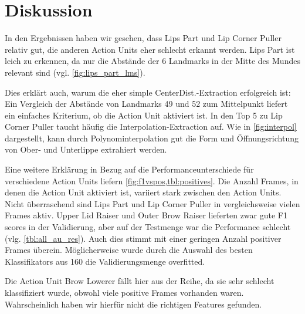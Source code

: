 \chapter{Diskussion}\label{ch:diskussion}

In den Ergebnissen haben wir gesehen, dass Lips Part und Lip Corner Puller
relativ gut, die anderen Action Units eher schlecht erkannt werden. Lips Part
ist leich zu erkennen, da nur die Abstände der 6 Landmarks in der Mitte des
Mundes relevant sind (vgl. \cref{fig:lips_part_lms}).

Dies erklärt auch, warum die eher simple CenterDist.-Extraction erfolgreich
ist: Ein Vergleich der Abstände von Landmarks 49 und 52 zum Mittelpunkt liefert
ein einfaches Kriterium, ob die Action Unit aktiviert ist.
In den Top 5 zu Lip Corner Puller taucht häufig die Interpolation-Extraction auf.
Wie in \cref{fig:interpol} dargestellt, kann durch Polynominterpolation gut die
Form und Öffnungsrichtung von Ober- und Unterlippe extrahiert werden. 

Eine weitere Erklärung in Bezug auf die Performanceunterschiede für verschiedene
Action Units liefern \cref{fig:f1vspos,tbl:positives}. Die Anzahl Frames, in
denen die Action Unit aktiviert ist, variiert stark zwischen den Action Units.
Nicht überraschend sind Lips Part und Lip Corner Puller in vergleichsweise
vielen Frames aktiv. Upper Lid Raiser und Outer Brow Raiser lieferten
zwar gute F1 scores in der Validierung, aber auf der Testmenge war die
Performance schlecht (vlg. \cref{tbl:all_au_res}). Auch dies stimmt mit einer
geringen Anzahl positiver Frames überein. Möglicherweise wurde durch die Auswahl
des besten Klassifikators aus 160 die Validierungsmenge overfitted.

Die Action Unit Brow Lowerer fällt hier aus der Reihe, da sie sehr schlecht
klassifiziert wurde, obwohl viele positive Frames vorhanden waren.
Wahrscheinlich haben wir hierfür nicht die richtigen Features gefunden.




